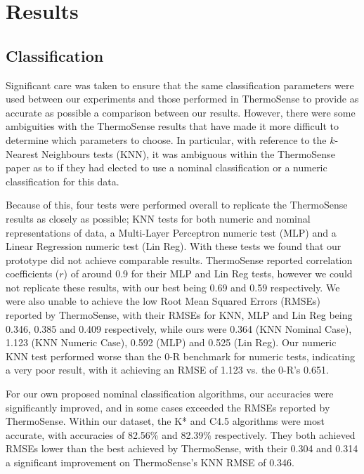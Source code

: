 \documentclass[../thesis/thesis.tex]{subfiles}
\begin{document}
\section{Results}
\label{sec:results}

\subsection{Classification}
\label{subsec:classification}

Significant care was taken to ensure that the same classification parameters were used between our experiments and those performed in ThermoSense to provide as accurate as possible a comparison between our results. However, there were some ambiguities with the ThermoSense results that have made it more difficult to determine which parameters to choose. In particular, with reference to the $k$-Nearest Neighbours tests (KNN), it was ambiguous within the ThermoSense paper as to if they had elected to use a nominal classification or a numeric classification for this data.

Because of this, four tests were performed overall to replicate the ThermoSense results as closely as possible; KNN tests for both numeric and nominal representations of data, a Multi-Layer Perceptron numeric test (MLP) and a Linear Regression numeric test (Lin Reg). With these tests we found that our prototype did not achieve comparable results. ThermoSense reported correlation coefficients ($r$) of around 0.9 for their MLP and Lin Reg tests, however we could not replicate these results, with our best being 0.69 and 0.59 respectively. We were also unable to achieve the low Root Mean Squared Errors (RMSEs) reported by ThermoSense, with their RMSEs for KNN, MLP and Lin Reg being 0.346, 0.385 and 0.409 respectively, while ours were 0.364 (KNN Nominal Case), 1.123 (KNN Numeric Case), 0.592 (MLP) and 0.525 (Lin Reg). Our numeric KNN test performed worse than the 0-R benchmark for numeric tests, indicating a very poor result, with it achieving an RMSE of 1.123 vs. the 0-R's 0.651.

For our own proposed nominal classification algorithms, our accuracies were significantly improved, and in some cases exceeded the RMSEs reported by ThermoSense. Within our dataset, the K* and C4.5 algorithms were most accurate, with accuracies of 82.56\% and 82.39\% respectively. They both achieved RMSEs lower than the best achieved by ThermoSense, with their 0.304 and 0.314 a significant improvement on ThermoSense's KNN RMSE of 0.346.
\end{document}
